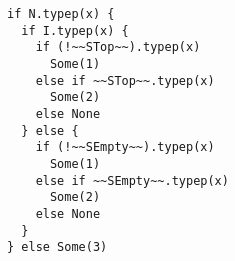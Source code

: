 \begin{lstlisting}[style=reclojureScala]
if N.typep(x) {
  if I.typep(x) {
    if (!~~STop~~).typep(x)
      Some(1)
    else if ~~STop~~.typep(x)
      Some(2)
    else None
  } else {
    if (!~~SEmpty~~).typep(x)
      Some(1)
    else if ~~SEmpty~~.typep(x)
      Some(2)
    else None
  }
} else Some(3)
\end{lstlisting}
